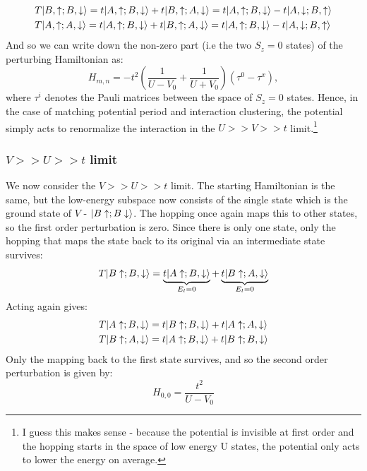 \documentclass[12pt]{article}
\DeclarePairedDelimiter\ket{\lvert}{\rangle}%
\numberwithin{equation}{section}
\begin{document}
\begin{align}
    &T\ket{B,\uparrow;B,\downarrow}=t\ket{A,\uparrow;B,\downarrow}+t\ket{B,\uparrow;A,\downarrow}
    =t\ket{A,\uparrow;B,\downarrow}-t\ket{A,\downarrow;B,\uparrow} \\
    &T\ket{A,\uparrow;A,\downarrow}=t\ket{A,\uparrow;B,\downarrow}+t\ket{B,\uparrow;A,\downarrow}
    =t\ket{A,\uparrow;B,\downarrow}-t\ket{A,\downarrow;B,\uparrow}
\end{align}
And so we can write down the non-zero part (i.e the two $S_z=0$ states)  of the perturbing Hamiltonian as:
\begin{equation}
    \boxed{
    H_{m,n} = -t^2 \left( \frac{1}{U - V_0} + \frac{1}{U + V_0} \right) (\tau^0 - \tau^x)
    },
\end{equation}
where $\tau^i$ denotes the Pauli matrices between the space of $S_z=0$ states. Hence, in the case of matching potential period and interaction clustering, the potential simply acts to renormalize the interaction in the $U>>V>>t$ limit.\footnote{I guess this makes sense - because the potential is invisible at first order and the hopping starts in the space of low energy U states, the potential only acts to lower the energy on average.}

\subsubsection{$V>>U>>t$ limit}
We now consider the $V>>U>>t$ limit. The starting Hamiltonian is the same, but the low-energy subspace now consists of the single state which is the ground state of $V$ - $\ket{B\uparrow; B\downarrow}$. The hopping once again maps this to other states, so the first order perturbation is zero. Since there is only one state, only the hopping that maps the state back to its original via an intermediate state survives:
\begin{align}
    T\ket{B\uparrow;B,\downarrow}=\underbrace{t\ket{A\uparrow;B,\downarrow}}_{E_l=0}
    +\underbrace{t\ket{B\uparrow;A,\downarrow}}_{E_l=0}
\end{align}
Acting again gives:
\begin{align}
    &T\ket{A\uparrow;B,\downarrow}=t\ket{B\uparrow;B,\downarrow}
    +t\ket{A\uparrow;A,\downarrow}\\
    &T\ket{B\uparrow;A,\downarrow}=t\ket{A\uparrow;B,\downarrow}
    +t\ket{B\uparrow;B,\downarrow}
\end{align}
Only the mapping back to the first state survives, and so the second order perturbation is given by:
\begin{equation}
    \boxed{
    H_{0,0}=\frac{t^2}{U-V_0}
    }
\end{equation}
\end{document}
